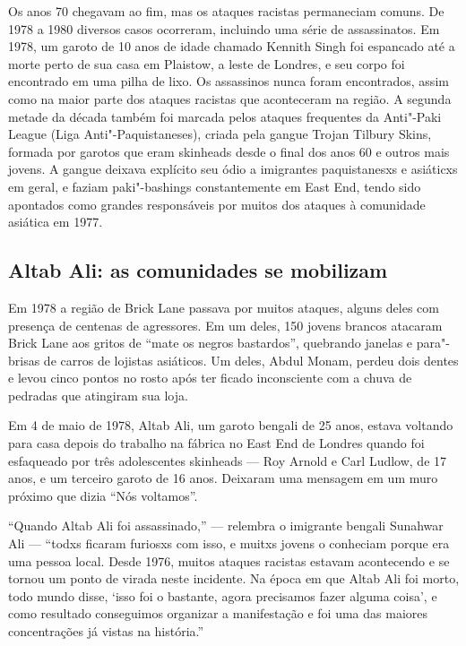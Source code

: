 Os anos 70 chegavam ao fim, mas os ataques racistas permaneciam comuns. De 1978 a 1980 diversos casos ocorreram, incluindo uma série de assassinatos. Em 1978, um garoto de 10 anos de idade chamado Kennith Singh foi espancado até a morte perto de sua casa em Plaistow, a leste de Londres, e seu corpo foi encontrado em uma pilha de lixo. Os assassinos nunca foram encontrados, assim como na maior parte dos ataques racistas que aconteceram na região. A segunda metade da década também foi marcada pelos ataques frequentes da Anti"-Paki League (Liga Anti"-Paquistaneses), criada pela gangue Trojan Tilbury Skins, formada por garotos que eram skinheads desde o final dos anos 60 e outros mais jovens. A gangue deixava explícito seu ódio a imigrantes paquistanesxs e asiáticxs em geral, e faziam paki"-bashings constantemente em East End, tendo sido apontados como grandes responsáveis por muitos dos ataques à comunidade asiática em 1977.


\subsection{Altab Ali: as comunidades se mobilizam}

Em 1978 a região de Brick Lane passava por muitos ataques, alguns deles com presença de centenas de agressores. Em um deles, 150 jovens brancos atacaram Brick Lane aos gritos de ``mate os negros bastardos'', quebrando janelas e para"-brisas de carros de lojistas asiáticos. Um deles, Abdul Monam, perdeu dois dentes e levou cinco pontos no rosto após ter ficado inconsciente com a chuva de pedradas que atingiram sua loja.

Em 4 de maio de 1978, Altab Ali, um garoto bengali de 25 anos, estava voltando para casa depois do trabalho na fábrica no East End de Londres quando foi esfaqueado por três adolescentes skinheads --- Roy Arnold e Carl Ludlow, de 17 anos, e um terceiro garoto de 16 anos. Deixaram uma mensagem em um muro próximo que dizia ``Nós voltamos''.

``Quando Altab Ali foi assassinado,'' --- relembra o imigrante bengali Sunahwar Ali --- ``todxs ficaram furiosxs com isso, e muitxs jovens o conheciam porque era uma pessoa local. Desde 1976, muitos ataques racistas estavam acontecendo e se tornou um ponto de virada neste incidente. Na época em que Altab Ali foi morto, todo mundo disse, `isso foi o bastante, agora precisamos fazer alguma coisa', e como resultado conseguimos organizar a manifestação e foi uma das maiores concentrações já vistas na história.''

